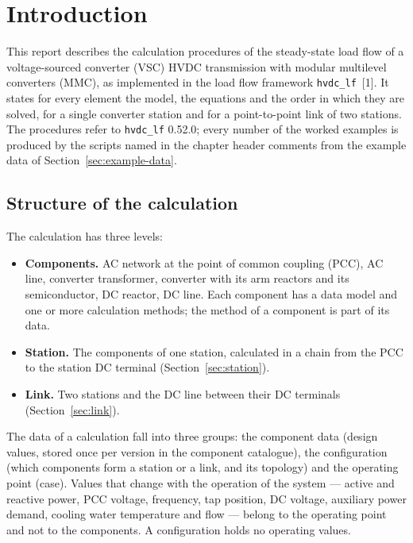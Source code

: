 \section{Introduction}
\label{sec:introduction}

This report describes the calculation procedures of the steady-state load flow of a voltage-sourced converter
(VSC) HVDC transmission with modular multilevel converters (MMC), as implemented in the load flow framework
\texttt{hvdc\_lf}~[1]. It states for every element the model, the equations and the order in which they are
solved, for a single converter station and for a point-to-point link of two stations. The procedures refer to
\texttt{hvdc\_lf} 0.52.0; every number of the worked examples is produced by the scripts named in the chapter
header comments from the example data of Section~\ref{sec:example-data}.

\subsection{Structure of the calculation}
\label{sec:structure}

The calculation has three levels:

\begin{itemize}
  \item \textbf{Components.} AC network at the point of common coupling (PCC), AC line, converter transformer,
        converter with its arm reactors and its semiconductor, DC reactor, DC line. Each component has a data model
        and one or more calculation methods; the method of a component is part of its data.
  \item \textbf{Station.} The components of one station, calculated in a chain from the PCC to the station DC
        terminal (Section~\ref{sec:station}).
  \item \textbf{Link.} Two stations and the DC line between their DC terminals (Section~\ref{sec:link}).
\end{itemize}

The data of a calculation fall into three groups: the component data (design values, stored once per version in
the component catalogue), the configuration (which components form a station or a link, and its topology) and the
operating point (case). Values that change with the operation of the system --- active and reactive power, PCC
voltage, frequency, tap position, DC voltage, auxiliary power demand, cooling water temperature and flow --- belong
to the operating point and not to the components. A configuration holds no operating values.

